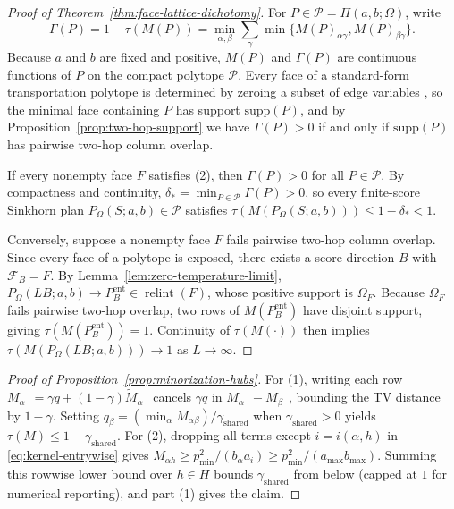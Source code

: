 \documentclass[10pt]{article}
\newcommand{\supp}{\mathrm{supp}}
\begin{document}
\begin{proof}[Proof of Theorem~\ref{thm:face-lattice-dichotomy}]
For $P \in \mathcal{P} = \Pi(a,b;\Omega)$, write
\[
  \Gamma(P) = 1 - \tau(M(P)) = \min_{\alpha,\beta} \sum_\gamma \min\{M(P)_{\alpha\gamma}, M(P)_{\beta\gamma}\}.
\]
Because $a$ and $b$ are fixed and positive, $M(P)$ and $\Gamma(P)$ are continuous functions of $P$ on the compact polytope $\mathcal{P}$. Every face of a standard-form transportation polytope is determined by zeroing a subset of edge variables \citep{deloera2013transportation}, so the minimal face containing $P$ has support $\supp(P)$, and by Proposition~\ref{prop:two-hop-support} we have $\Gamma(P) > 0$ if and only if $\supp(P)$ has pairwise two-hop column overlap.

If every nonempty face $F$ satisfies (2), then $\Gamma(P) > 0$ for all $P \in \mathcal{P}$. By compactness and continuity, $\delta_* = \min_{P \in \mathcal{P}} \Gamma(P) > 0$, so every finite-score Sinkhorn plan $P_\Omega(S;a,b) \in \mathcal{P}$ satisfies $\tau(M(P_\Omega(S;a,b))) \le 1 - \delta_* < 1$.

Conversely, suppose a nonempty face $F$ fails pairwise two-hop column overlap. Since every face of a polytope is exposed, there exists a score direction $B$ with $\mathcal{F}_B = F$. By Lemma~\ref{lem:zero-temperature-limit}, $P_\Omega(LB;a,b) \to P_B^{\mathrm{ent}} \in \operatorname{relint}(F)$, whose positive support is $\Omega_F$. Because $\Omega_F$ fails pairwise two-hop overlap, two rows of $M(P_B^{\mathrm{ent}})$ have disjoint support, giving $\tau(M(P_B^{\mathrm{ent}})) = 1$. Continuity of $\tau(M(\cdot))$ then implies $\tau(M(P_\Omega(LB;a,b))) \to 1$ as $L \to \infty$.
\end{proof}

\begin{proof}[Proof of Proposition~\ref{prop:minorization-hubs}]
For (1), writing each row $M_{\alpha\cdot} = \gamma q + (1-\gamma)\widetilde M_{\alpha\cdot}$ cancels $\gamma q$ in $M_{\alpha\cdot} - M_{\beta\cdot}$, bounding the TV distance by $1-\gamma$. Setting $q_\beta = (\min_\alpha M_{\alpha\beta})/\gamma_{\mathrm{shared}}$ when $\gamma_{\mathrm{shared}} > 0$ yields $\tau(M) \le 1 - \gamma_{\mathrm{shared}}$. For (2), dropping all terms except $i = i(\alpha, h)$ in \eqref{eq:kernel-entrywise} gives $M_{\alpha h} \ge p_{\min}^2 / (b_\alpha a_i) \ge p_{\min}^2 / (a_{\max} b_{\max})$. Summing this rowwise lower bound over $h \in H$ bounds $\gamma_{\mathrm{shared}}$ from below (capped at $1$ for numerical reporting), and part (1) gives the claim.
\end{proof}
\end{document}
